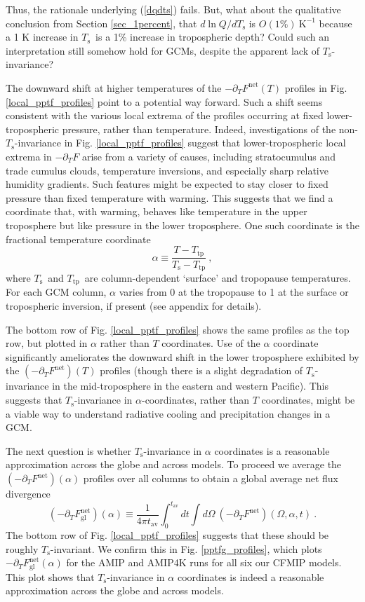 \documentclass[10pt]{article}
\newcommand{\beqn}{\begin{equation}}
\newcommand{\eeqn}{\end{equation}}
\newcommand{\eqnref}[1]{(\ref{#1})}
\newcommand{\ppt}{\ensuremath{\partial_T}}
\newcommand{\Fnet}{\ensuremath{F^\mathrm{net}}}
\newcommand{\Fnetgl}{\ensuremath{F^\mathrm{net}_{\mathrm{gl}}}}
\newcommand{\Ts}{\ensuremath{T_\mathrm{s}}}
\newcommand{\Ttp}{\ensuremath{T_\mathrm{tp}}}
\newcommand{\Kinverse}{\ensuremath{\mathrm{K^{-1}}}}
\newcommand{\tav}{\ensuremath{t_\mathrm{av}}}
\begin{document}
Thus, the rationale underlying \eqnref{dqdts} fails. But, what about the qualitative conclusion from Section \ref{sec_1percent}, that $d\ln Q/d\Ts$ is $O(1\%)\ \Kinverse$ because a 1 K increase in \Ts\ is a 1\% increase in tropospheric depth? Could such an interpretation still somehow hold for GCMs, despite the apparent lack of \Ts-invariance?

The downward shift at higher temperatures of the $-\ppt \Fnet(T)$ profiles  in  Fig. \ref{local_pptf_profiles} point to a potential way forward. Such a shift seems consistent with the various local extrema of the profiles occurring at fixed lower-tropospheric pressure, rather than temperature. Indeed, investigations of the non-\Ts-invariance in Fig. \ref{local_pptf_profiles} suggest that lower-tropospheric local extrema in $-\ppt F$  arise from a variety of causes, including stratocumulus and trade cumulus clouds, temperature inversions, and especially sharp relative humidity gradients. Such features might be expected to stay closer to fixed pressure than fixed temperature with warming. This suggests that we find a coordinate that, with warming, behaves like temperature in the upper troposphere but like pressure in the lower troposphere. One such coordinate is the fractional temperature coordinate
\beqn
	\alpha \equiv \frac{T-\Ttp}{\Ts - \Ttp}\ ,
	\label{alpha_def}
\eeqn
where \Ts\ and \Ttp\ are column-dependent `surface' and tropopause temperatures. For each GCM column, $\alpha$ varies from 0 at the tropopause to 1 at the surface or tropospheric inversion, if present  (see appendix for details).

The bottom row of Fig. \ref{local_pptf_profiles} shows the same profiles as the top row, but plotted in $\alpha$ rather than $T$ coordinates. Use of the $\alpha$ coordinate significantly ameliorates the downward shift in the lower troposphere exhibited by the $(-\ppt \Fnet)(T)$ profiles (though there is a slight degradation of \Ts-invariance in the mid-troposphere in the eastern and western Pacific).  This suggests that \Ts-invariance in $\alpha$-coordinates, rather than $T$ coordinates, might be a viable way to understand radiative cooling and precipitation changes in a GCM.

The next question is whether \Ts-invariance in $\alpha$ coordinates is a reasonable approximation across the globe and across models. To proceed we average the $(-\ppt \Fnet)(\alpha)$ profiles over all columns to obtain a global average net flux divergence
	\beqn
		(-\ppt \Fnetgl)(\alpha) \equiv \frac{1}{4\pi\tav}\int_0^{\tav} dt \int d \Omega\  (-\ppt \Fnet)(\Omega,\alpha,t) \ .
		\label{pptfgl_def}
	\eeqn
The bottom row of Fig. \ref{local_pptf_profiles} suggests that these should be roughly \Ts-invariant. We confirm this  in Fig. \ref{pptfg_profiles}, which plots $-\ppt \Fnetgl(\alpha)$ for the AMIP and AMIP4K runs for all six our CFMIP models.  This plot shows that \Ts-invariance in $\alpha$ coordinates is indeed a reasonable approximation across the globe and across models. 
\end{document}
